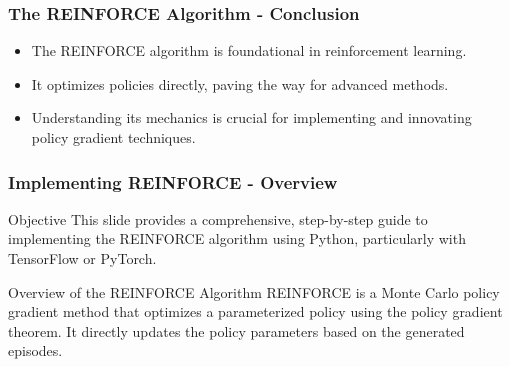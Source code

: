 \documentclass{beamer}
\begin{document}
\begin{frame}[fragile]
    \frametitle{The REINFORCE Algorithm - Conclusion}
    \begin{itemize}
        \item The REINFORCE algorithm is foundational in reinforcement learning.
        \item It optimizes policies directly, paving the way for advanced methods.
        \item Understanding its mechanics is crucial for implementing and innovating policy gradient techniques.
    \end{itemize}
\end{frame}

\begin{frame}[fragile]
    \frametitle{Implementing REINFORCE - Overview}
    \begin{block}{Objective}
        This slide provides a comprehensive, step-by-step guide to implementing the REINFORCE algorithm using Python, particularly with TensorFlow or PyTorch.
    \end{block}
    
    \begin{block}{Overview of the REINFORCE Algorithm}
        REINFORCE is a Monte Carlo policy gradient method that optimizes a parameterized policy using the policy gradient theorem. It directly updates the policy parameters based on the generated episodes.
    \end{block}
\end{frame}
\end{document}
